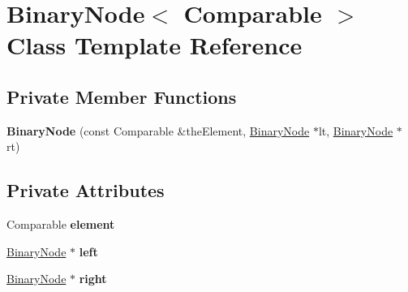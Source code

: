 \hypertarget{class_binary_node}{}\section{Binary\+Node$<$ Comparable $>$ Class Template Reference}
\label{class_binary_node}
\subsection*{Private Member Functions}
\begin{DoxyCompactItemize}
\item 
\mbox{\label{class_binary_node_aff89d3679c077d70b67ad16e9816d884}} 
{\bfseries Binary\+Node} (const Comparable \&the\+Element, \hyperlink{class_binary_node}{Binary\+Node} $\ast$lt, \hyperlink{class_binary_node}{Binary\+Node} $\ast$rt)
\end{DoxyCompactItemize}
\subsection*{Private Attributes}
\begin{DoxyCompactItemize}
\item 
\mbox{\label{class_binary_node_a75804c1624577ae485b775408b54bd06}} 
Comparable {\bfseries element}
\item 
\mbox{\label{class_binary_node_a2b6352b5519f90f2d9c2d610b2278dac}} 
\hyperlink{class_binary_node}{Binary\+Node} $\ast$ {\bfseries left}
\item 
\mbox{\label{class_binary_node_a847342c242923f34b77fc5e402fbbb4b}} 
\hyperlink{class_binary_node}{Binary\+Node} $\ast$ {\bfseries right}
\end{DoxyCompactItemize}
